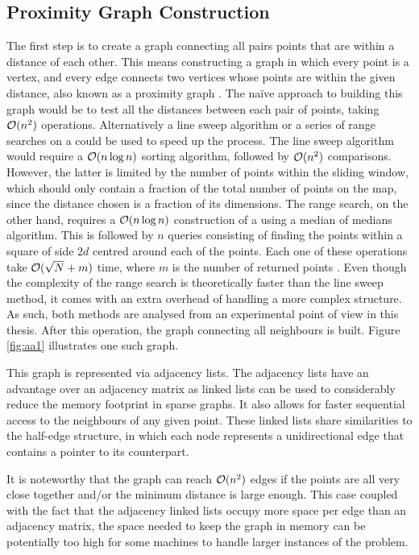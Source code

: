 \subsection{Proximity Graph Construction}
The first step is to create a graph connecting all pairs points that are within a distance of each other. This means constructing a graph in which every point is a vertex, and every edge connects two vertices whose points are within the given distance, also known as a proximity graph \cite{proximity}. The naïve approach to building this graph would be to test all the distances between each pair of points, taking $\mathcal{O}(n^2)$ operations. Alternatively a line sweep algorithm or a series of range searches on a \kdtree could be used to speed up the process. The line sweep algorithm would require a $\mathcal{O}(n \log{n})$ sorting algorithm, followed by $\mathcal{O}(n^2)$ comparisons. However, the latter is limited by the number of points within the sliding window, which should only contain a fraction of the total number of points on the map, since the distance chosen is a fraction of its dimensions. The \kdtree range search, on the other hand, requires a $\mathcal{O}(n \log{n})$ construction of a \kdtree using a median of medians algorithm. This is followed by $n$ queries consisting of finding the points within a square of side $2d$ centred around each of the points. Each one of these operations take $\mathcal{O}(\sqrt{N}+m)$ time, where $m$ is the number of returned points \cite{kdrange}. Even though the complexity of the \kdtree range search is theoretically faster than the line sweep method, it comes with an extra overhead of handling a more complex structure. As such, both methods are analysed from an experimental point of view in this thesis. After this operation, the graph connecting all neighbours is built. Figure \ref{fig:aa1} illustrates one such graph.



This graph is represented via adjacency lists. The adjacency lists have an advantage over an adjacency matrix as linked lists can be used to considerably reduce the memory footprint in sparse graphs. It also allows for faster sequential access to the neighbours of any given point. These linked lists share similarities to the half-edge structure, in which each node represents a unidirectional edge that contains a pointer to its counterpart.

It is noteworthy that the graph can reach $\mathcal{O}(n^2)$ edges if the points are all very close together and/or the minimum distance is large enough. This case coupled with the fact that the adjacency linked lists occupy more space per edge than an adjacency matrix, the space needed to keep the graph in memory can be potentially too high for some machines to handle larger instances of the problem. 

